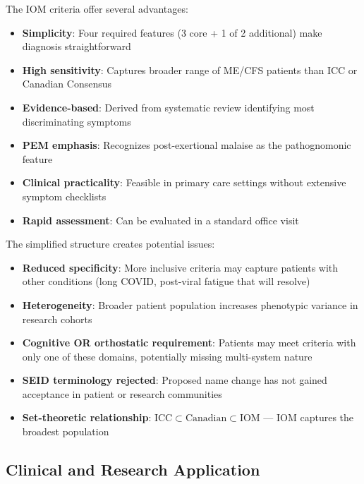 \begin{observation}
\label{obs:iom-strengths}
The IOM criteria offer several advantages:
\begin{itemize}
    \item \textbf{Simplicity}: Four required features (3 core + 1 of 2 additional) make diagnosis straightforward
    \item \textbf{High sensitivity}: Captures broader range of ME/CFS patients than ICC or Canadian Consensus
    \item \textbf{Evidence-based}: Derived from systematic review identifying most discriminating symptoms
    \item \textbf{PEM emphasis}: Recognizes post-exertional malaise as the pathognomonic feature
    \item \textbf{Clinical practicality}: Feasible in primary care settings without extensive symptom checklists
    \item \textbf{Rapid assessment}: Can be evaluated in a standard office visit
\end{itemize}
\end{observation}

\begin{warning}
\label{warn:iom-limitations}
The simplified structure creates potential issues:
\begin{itemize}
    \item \textbf{Reduced specificity}: More inclusive criteria may capture patients with other conditions (long COVID, post-viral fatigue that will resolve)
    \item \textbf{Heterogeneity}: Broader patient population increases phenotypic variance in research cohorts
    \item \textbf{Cognitive OR orthostatic requirement}: Patients may meet criteria with only one of these domains, potentially missing multi-system nature
    \item \textbf{SEID terminology rejected}: Proposed name change has not gained acceptance in patient or research communities
    \item \textbf{Set-theoretic relationship}: $\text{ICC} \subset \text{Canadian} \subset \text{IOM}$ --- IOM captures the broadest population
\end{itemize}
\end{warning}

\subsection{Clinical and Research Application}

